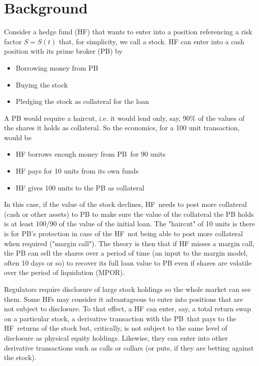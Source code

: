 \documentclass{article}
\begin{document}
\section{Background}

Consider a hedge fund (HF) that wants to enter into a position referencing a
risk factor $S=S(t)$ that, for simplicity, we call a stock. HF can enter
into a cash position with its prime broker (PB) by

\begin{itemize}
\item Borrowing money from PB

\item Buying the stock

\item Pledging the stock as collateral for the loan
\end{itemize}

A PB would require a haircut, i.e. it would lend only, say, 90\% of the
values of the shares it holds as collateral. So the economics, for a 100
unit transaction, would be

\begin{itemize}
\item HF borrows enough money from PB\ for 90 units

\item HF pays for 10 units from its own funds

\item HF gives 100 units to the PB as collateral
\end{itemize}

In this case, if the value of the stock declines, HF\ needs to post more
collateral (cash or other assets) to PB to make sure the value of the
collateral the PB holds is at least 100/90 of the value of the initial loan.
The "haircut" of 10 units is there is for PB's protection in case of the HF\
not being able to post more collateral when required ("margin call"). The
theory is then that if HF misses a margin call, the PB can sell the shares
over a period of time (an input to the margin model, often 10 days or so) to
recover its full loan value to PB even if shares are volatile over the
period of liquidation (MPOR).

Regulators require disclosure of large stock holdings so the whole market
can see them. Some HFs may consider it advantageous to enter into positions
that are not subject to disclosure. To that effect, a HF can enter, say, a
total return swap on a particular stock, a derivative transaction with the
PB\ that pays to the HF\ returns of the stock but, critically, is not
subject to the same level of disclosure as physical equity holdings.
Likewise, they can enter into other derivative transactions such as calls or
collars (or puts, if they are betting against the stock).
\end{document}
